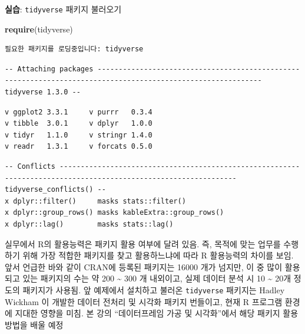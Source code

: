 \documentclass[
  11pt,
]{krantz}
\makeatletter
\newenvironment{Shaded}{\begin{snugshade}}{\end{snugshade}}
\newcommand{\KeywordTok}[1]{\textcolor[rgb]{0.27,0.27,0.27}{\textbf{#1}}}
\newcommand{\NormalTok}[1]{#1}
\newenvironment{kframe}{%
\medskip{}
\setlength{\fboxsep}{.8em}
 \def\at@end@of@kframe{}%
 \ifinner\ifhmode%
  \def\at@end@of@kframe{\end{minipage}}%
  \begin{minipage}{\columnwidth}%
 \fi\fi%
 \def\FrameCommand##1{\hskip\@totalleftmargin \hskip-\fboxsep
 \colorbox{shadecolor}{##1}\hskip-\fboxsep
     \hskip-\linewidth \hskip-\@totalleftmargin \hskip\columnwidth}%
 \MakeFramed {\advance\hsize-\width
   \@totalleftmargin\z@ \linewidth\hsize
   \@setminipage}}%
 {\par\unskip\endMakeFramed%
 \at@end@of@kframe}
\newenvironment{rmdblock}[1]
  {
  \begin{itemize}
  \renewcommand{\labelitemi}{
    \raisebox{-.7\height}[0pt][0pt]{
      {\setkeys{Gin}{width=3em,keepaspectratio}\texttt{[image: images/\#1]}}
    }
  }
  \setlength{\fboxsep}{1em}
  \begin{kframe}
  \item
  }
  {
  \end{kframe}
  \end{itemize}
  }
\newenvironment{rmdnote}
  {\begin{rmdblock}{note}}
  {\end{rmdblock}}
\newenvironment{rmdimportant}
  {\begin{rmdblock}{important}}
  {\end{rmdblock}}
\makeatother
\begin{document}
\footnotesize

\begin{rmdimportant}
\begin{rmdimportant}

\textbf{실습}: \texttt{tidyverse} 패키지 불러오기

\end{rmdimportant}
\end{rmdimportant}

\normalsize

\footnotesize

\begin{Shaded}
\begin{Highlighting}[]
\KeywordTok{require}\NormalTok{(tidyverse)}
\end{Highlighting}
\end{Shaded}

\begin{verbatim}
필요한 패키지를 로딩중입니다: tidyverse
\end{verbatim}

\begin{verbatim}
-- Attaching packages ------------------------------------------------------------------------------------------------------------- tidyverse 1.3.0 --
\end{verbatim}

\begin{verbatim}
v ggplot2 3.3.1     v purrr   0.3.4
v tibble  3.0.1     v dplyr   1.0.0
v tidyr   1.1.0     v stringr 1.4.0
v readr   1.3.1     v forcats 0.5.0
\end{verbatim}

\begin{verbatim}
-- Conflicts ---------------------------------------------------------------------------------------------------------------- tidyverse_conflicts() --
x dplyr::filter()     masks stats::filter()
x dplyr::group_rows() masks kableExtra::group_rows()
x dplyr::lag()        masks stats::lag()
\end{verbatim}

\normalsize

\footnotesize

\begin{rmdnote}
\begin{rmdnote}

실무에서 R의 활용능력은 패키지 활용 여부에 달려 있음. 즉, 목적에 맞는 업무를 수행하기 위해 가장 적합한 패키지를 찾고 활용하느냐에 따라 R 활용능력의 차이를 보임. 앞서 언급한 바와 같이 CRAN에 등록된 패키지는 16000 개가 넘지만, 이 중 많이 활용되고 있는 패키지의 수는 약 200 \textasciitilde{} 300 개 내외이고, 실제 데이터 분석 시 10 \textasciitilde{} 20개 정도의 패키지가 사용됨. 앞 예제에서 설치하고 불러온 \texttt{tidyverse} 패키지는 Hadley Wickham \citep{tidyverse2019}이 개발한 데이터 전처리 및 시각화 패키지 번들이고, 현재 R 프로그램 환경에 지대한 영향을 미침. 본 강의 ``데이터프레임 가공 및 시각화''에서 해당 패키지 활용 방법을 배울 예정

\end{rmdnote}
\end{rmdnote}
\end{document}
